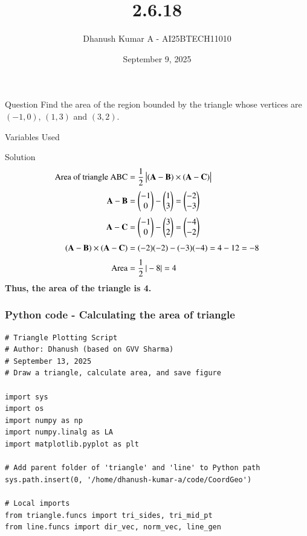 \documentclass{beamer}
\title{2.6.18}
\author{Dhanush Kumar A - AI25BTECH11010}
\date{September 9, 2025}
\begin{document}
\frame{\titlepage}

\begin{frame}{Question}
Find the area of the region bounded by the triangle whose vertices are $(-1, 0)$, $(1, 3)$ and $(3, 2)$.
\end{frame}

\begin{frame}{Variables Used}
\begin{table}[H]    
  \centering
  \caption{Variables Used}
  \label{tab:variables}
\end{table}
\end{frame}




\begin{frame}{Solution}
\begin{align}
\text{Area of triangle ABC} &= \frac{1}{2} \, \big| (\mathbf{A}-\mathbf{B}) \times (\mathbf{A}-\mathbf{C}) \big| \\[1mm]
\mathbf{A}-\mathbf{B} &= \begin{pmatrix}-1 \\ 0\end{pmatrix} - \begin{pmatrix}1 \\ 3\end{pmatrix} = \begin{pmatrix}-2 \\ -3\end{pmatrix} \\[1mm]
\mathbf{A}-\mathbf{C} &= \begin{pmatrix}-1 \\ 0\end{pmatrix} - \begin{pmatrix}3 \\ 2\end{pmatrix} = \begin{pmatrix}-4 \\ -2\end{pmatrix} \\[1mm]
(\mathbf{A}-\mathbf{B}) \times (\mathbf{A}-\mathbf{C}) &= (-2)(-2) - (-3)(-4) = 4 - 12 = -8 \\[1mm]
\text{Area} &= \frac{1}{2} \, | -8 | = 4
\end{align}
\noindent\textbf{Thus, the area of the triangle is 4.}
\end{frame}

\begin{frame}[fragile]                            
\frametitle{Python code - Calculating the area of triangle}                
\begin{lstlisting}
# Triangle Plotting Script
# Author: Dhanush (based on GVV Sharma)
# September 13, 2025
# Draw a triangle, calculate area, and save figure

import sys
import os
import numpy as np
import numpy.linalg as LA
import matplotlib.pyplot as plt

# Add parent folder of 'triangle' and 'line' to Python path
sys.path.insert(0, '/home/dhanush-kumar-a/code/CoordGeo')

# Local imports
from triangle.funcs import tri_sides, tri_mid_pt
from line.funcs import dir_vec, norm_vec, line_gen
\end{lstlisting}

\end{frame}
\end{document}
